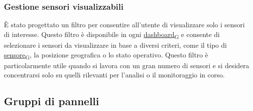 \subsubsection{Gestione sensori visualizzabili}
È stato progettato un filtro per consentire all'utente di visualizzare solo i sensori di interesse. Questo filtro è disponibile in ogni \href{https://7last.github.io/docs/pb/documentazione-interna/glossario\#dashboard}{dashboard\textsubscript{G}} e consente di selezionare i sensori da visualizzare in base a diversi criteri, come il tipo di \href{https://7last.github.io/docs/pb/documentazione-interna/glossario\#sensore}{sensore\textsubscript{G}}, la posizione geografica o lo stato operativo. Questo filtro è particolarmente utile quando si lavora con un gran numero di sensori e si desidera concentrarsi solo su quelli rilevanti per l'analisi o il monitoraggio in corso.


\subsection{Gruppi di pannelli}
